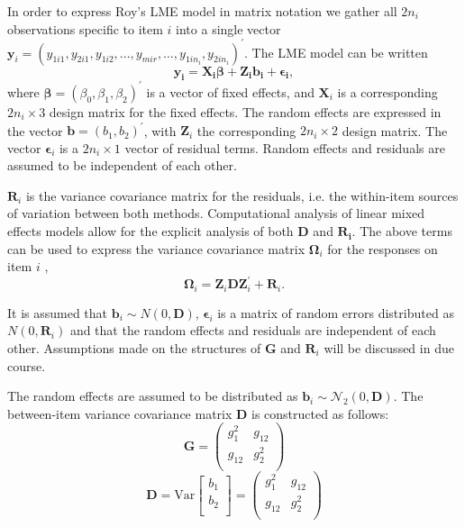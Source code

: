 \documentclass[12pt, a4paper]{report}
\theoremstyle{plain}
\theoremstyle{definition}
\theoremstyle{remark}
\begin{document}
	
	In order to express Roy's LME model in matrix notation we gather all $2n_i$ observations specific to item $i$ into a single vector  $\boldsymbol{y}_{i} = (y_{1i1},y_{2i1},y_{1i2},\ldots,y_{mir},\ldots,y_{1in_{i}},y_{2in_{i}})^\prime.$ The LME model can be written
	\[
	\boldsymbol{y_{i}} = \boldsymbol{X_{i}\beta} + \boldsymbol{Z_{i}b_{i}} + \boldsymbol{\epsilon_{i}},
	\]
	where $\boldsymbol{\beta}=(\beta_0,\beta_1,\beta_2)^\prime$ is a vector of fixed effects, and $\boldsymbol{X}_i$ is a corresponding $2n_i\times 3$ design matrix for the fixed effects. The random effects are expressed in the vector $\boldsymbol{b}=(b_1,b_2)^\prime$, with $\boldsymbol{Z}_i$ the corresponding $2n_i\times 2$ design matrix. The vector $\boldsymbol{\epsilon}_i$ is a $2n_i\times 1$ vector of residual terms. Random effects and residuals are assumed to be independent of each other.
	
	$\boldsymbol{R}_{i}$ is the variance covariance matrix for the residuals, i.e. the within-item sources of variation between both methods. Computational analysis of linear mixed effects models allow for the explicit analysis of both $\boldsymbol{D}$ and $\boldsymbol{R_i}$.
	The above terms can be used to express the  variance covariance matrix $\boldsymbol{\Omega}_i$ for the responses on item $i$ ,
	\[
	\boldsymbol{\Omega}_i = \boldsymbol{Z}_i \boldsymbol{D} \boldsymbol{Z}_i^{\prime} + \boldsymbol{R}_i.
	\]
	
	It is assumed that $\boldsymbol{b}_i \sim N(0,\boldsymbol{D})$, $\boldsymbol{\epsilon}_i$ is a matrix of random errors distributed as $N(0,\boldsymbol{R}_i)$ and that the random effects and residuals are independent of each other. Assumptions made on the structures of $\boldsymbol{G}$ and $\boldsymbol{R}_i$ will be discussed in due course.
	
	The random effects are assumed to be distributed as $\boldsymbol{b}_i \sim \mathcal{N}_2(0,\boldsymbol{D})$. The between-item variance covariance matrix $\boldsymbol{D}$ is constructed as follows:
	\[ \boldsymbol{G} =\left(
	\begin{array}{cc}
	g^2_1  & g_{12} \\
	g_{12} & g^2_2 \\
	\end{array}
	\right) \]
	\[ \boldsymbol{D} = \mbox{Var}  \left[
	\begin{array}{c}
	b_1   \\
	b_2  \\
	\end{array}
	\right] =  \left(
	\begin{array}{cc}
	g^2_1  & g_{12} \\
	g_{12} & g^2_2 \\
	\end{array}
	\right) \]
	
\end{document}
